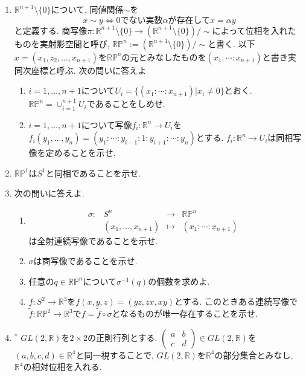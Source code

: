 \documentclass[dvipdfmx,a4paper,11pt]{article}
\newcommand{\R}{\mathbb{R}}
\theoremstyle{definition}
\begin{document}
\begin{enumerate}[ label=\textbf{問}6.\arabic*]
\item $\R^{n+1} \setminus \{ 0\}$について, 同値関係$\sim$を
	$$
	x \sim y \Leftrightarrow \text{0でない実数$\alpha$が存在して$x = \alpha y$}
	$$
	と定義する. 商写像$\pi : \R^{n+1} \setminus \{ 0\} \rightarrow (\R^{n+1} \setminus \{ 0\})/\sim$によって位相を入れたものを実射影空間と呼び, $ \R\mathbb{P}^{n}:= (\R^{n+1} \setminus \{ 0\})/\sim$と書く.  以下$x= (x_{1}, z_{2}, \ldots, x_{n+1})$を$\R\mathbb{P}^{n}$の元とみなしたものを$(x_{1}: \cdots : x_{n+1})$と書き実同次座標と呼ぶ. 
次の問いに答えよ
	\begin{enumerate}
	\item $i=1,\ldots, n+1$について$U_{i} = \{(x_{1}: \cdots : x_{n+1}) | x_i \neq 0\}$とおく. $\R\mathbb{P}^{n} = \cup_{i=1}^{n+1}U_i$であることをしめせ.
	\item $i=1,\ldots, n+1$について写像$f_i : \R^{n} \rightarrow U_i$を$f_i(y_1, \ldots,y_{n})=(y_1: \cdots :y_{i-1}:1:y_{i+1}:\cdots : y_{n} )$とする. $f_i : \R^{n} \rightarrow U_i$は同相写像を定めることを示せ.
	\end{enumerate}
\item $ \R\mathbb{P}^{1}$は$S^1$と同相であることを示せ.
\item 次の問いに答えよ.	
	\begin{enumerate}
	\item 
	$$
\begin{array}{ccccc}
\sigma: &S^{n}& \rightarrow & \R\mathbb{P}^{n}& \\
&(x_{1}, \ldots, x_{n+1}) & \longmapsto & 
(x_{1}: \cdots : x_{n+1})&
\end{array}
$$
は全射連続写像であることを示せ.
	\item $\sigma$は商写像であることを示せ. 
	\item 任意の$q \in \R\mathbb{P}^{n}$について$\sigma^{-1}(q)$の個数を求めよ.
	\item $f : S^2 \rightarrow \R^3$を$f(x,y,z)=(yz,zx,xy)$とする.  このときある連続写像で$\tilde{f}: \R\mathbb{P}^{2} \rightarrow \R^3$で$f =\tilde{f} \circ  \sigma$となるものが唯一存在することを示せ. 

	\end{enumerate}
\item$^{*}$
$GL(2, \R) $を$2 \times 2$の正則行列とする. $\begin{pmatrix}
a & b\\
c& d
\end{pmatrix}
\in GL(2, \R) $を$(a,b,c,d) \in \R^4$と同一視することで, $GL(2, \R)$を$\R^4$の部分集合とみなし, $\R^4$の相対位相を入れる.


\end{enumerate}
\end{document}
